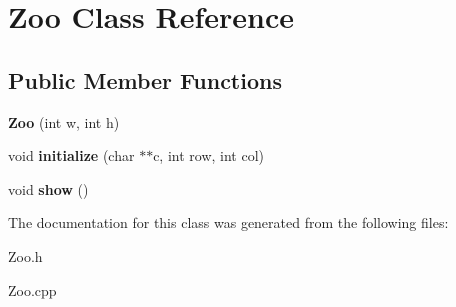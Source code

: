 \hypertarget{classZoo}{}\section{Zoo Class Reference}
\label{classZoo}
\subsection*{Public Member Functions}
\begin{DoxyCompactItemize}
\item 
{\bfseries Zoo} (int w, int h)\hypertarget{classZoo_a5e4518eccc8e44d23c4b0f37e7e503cc}{}\label{classZoo_a5e4518eccc8e44d23c4b0f37e7e503cc}

\item 
void {\bfseries initialize} (char $\ast$$\ast$c, int row, int col)\hypertarget{classZoo_a8236fa2a39cd2c6c4535d638d2edee1c}{}\label{classZoo_a8236fa2a39cd2c6c4535d638d2edee1c}

\item 
void {\bfseries show} ()\hypertarget{classZoo_aed92b968c2bb9dd83993cc7707b1b6b9}{}\label{classZoo_aed92b968c2bb9dd83993cc7707b1b6b9}

\end{DoxyCompactItemize}


The documentation for this class was generated from the following files\+:\begin{DoxyCompactItemize}
\item 
Zoo.\+h\item 
Zoo.\+cpp\end{DoxyCompactItemize}
